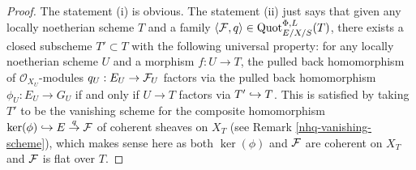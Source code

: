 \begin{proof} The statement (i) is obvious. The statement (ii) just says that
given any locally noetherian scheme $T$ and a family
$\langle \mathcal{F},q\rangle \in \operatorname{Quot}_{E/X/S}^{\Phi,L}(T)$, there exists
a closed subscheme $T' \subset T$ with the following universal property:
for any locally noetherian scheme $U$ and a morphism $f: U\to T$,
the pulled back homomorphism of ${\mathcal O}_{X_U}$-modules $q_U : E_U \to \mathcal{F}_U$
factors via the pulled back homomorphism $\phi_U : E_U \to G_U$
if and only if $U \to T$ factors via $T'\hookrightarrow T$.
This is satisfied by taking $T'$ to be the vanishing scheme
for the composite homomorphism $\operatorname{ker}(\phi) \hookrightarrow  E \stackrel{q}{\to} \mathcal{F}$
of coherent sheaves on $X_T$ (see Remark \ref{nhq-vanishing-scheme}),
which makes sense here as both $\ker(\phi)$ and $\mathcal{F}$ are coherent
on $X_T$ and $\mathcal{F}$ is flat over $T$. \end{proof}



